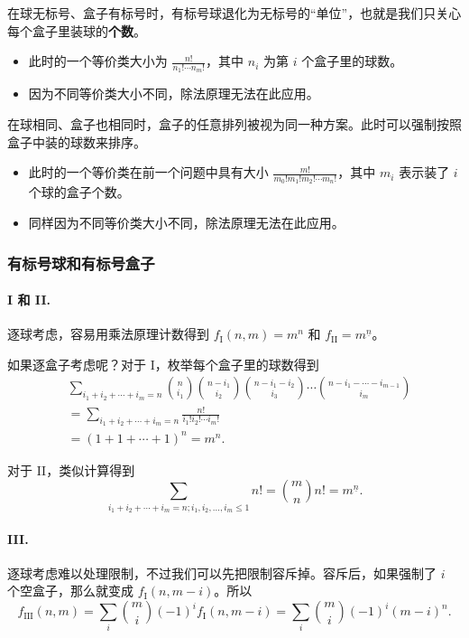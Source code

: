     在球无标号、盒子有标号时，有标号球退化为无标号的“单位”，也就是我们只关心每个盒子里装球的\textbf{个数}。
    \begin{itemize}
        \item 此时的一个等价类大小为 $\frac{n!}{n_1!\cdots n_m!}$，其中 $n_i$ 为第 $i$ 个盒子里的球数。
        \item 因为不同等价类大小不同，除法原理无法在此应用。
    \end{itemize} 

    在球相同、盒子也相同时，盒子的任意排列被视为同一种方案。此时可以强制按照盒子中装的球数来排序。
    \begin{itemize}
        \item 此时的一个等价类在前一个问题中具有大小 $\frac{m!}{m_0!m_1!m_2!\cdots m_n!}$，其中 $m_i$ 表示装了 $i$ 个球的盒子个数。
        \item 同样因为不同等价类大小不同，除法原理无法在此应用。
    \end{itemize}
\subsubsection{有标号球和有标号盒子}
    \paragraph{I 和 II. } 逐球考虑，容易用乘法原理计数得到 $f_{\mathrm{I}}(n,m)=m^n$ 和 $f_{\mathrm{II}}=m^{\underline n}$。

    如果逐盒子考虑呢？对于 I，枚举每个盒子里的球数得到
    $$
    \begin{aligned}
    &\sum_{i_1+i_2+\cdots+i_m=n}\binom{n}{i_1}\binom{n-i_1}{i_2}\binom{n-i_1-i_2}{i_3}\cdots\binom{n-i_1-\cdots-i_{m-1}}{i_m}\\
    &=\sum_{i_1+i_2+\cdots+i_m=n}\frac{n!}{i_1!i_2!\cdots i_m!}\\
    &=(1+1+\cdots+1)^n=m^n.
    \end{aligned}
    $$

    对于 II，类似计算得到 
    $$
    \sum_{i_1+i_2+\cdots+i_m=n;i_1,i_2,\ldots,i_m\le 1}n!=\binom{m}{n}n!=m^{\underline{n}}.
    $$

    \paragraph{III. }    逐球考虑难以处理限制，不过我们可以先把限制容斥掉。容斥后，如果强制了 $i$ 个空盒子，那么就变成 $f_{\mathrm{I}}(n,m-i)$。所以
    $$
    f_{\mathrm{III}}(n,m)=\sum_i\binom{m}{i}(-1)^i f_{\mathrm{I}}(n,m-i)=\sum_{i}\binom{m}{i}(-1)^i (m-i)^n.
    $$

